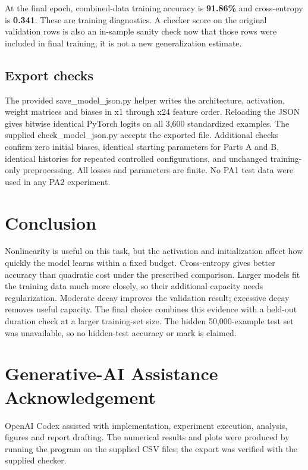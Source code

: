 \documentclass[11pt,a4paper]{article}
\begin{document}
At the final epoch, combined-data training accuracy is \textbf{91.86\%} and cross-entropy is \textbf{0.341}. These are training diagnostics. A checker score on the original validation rows is also an in-sample sanity check now that those rows were included in final training; it is not a new generalization estimate.


\subsection*{Export checks}

The provided save\_model\_json.py helper writes the architecture, activation, weight matrices and biases in x1 through x24 feature order. Reloading the JSON gives bitwise identical PyTorch logits on all 3,600 standardized examples. The supplied check\_model\_json.py accepts the exported file. Additional checks confirm zero initial biases, identical starting parameters for Parts A and B, identical histories for repeated controlled configurations, and unchanged training-only preprocessing. All losses and parameters are finite. No PA1 test data were used in any PA2 experiment.


\section{Conclusion}

Nonlinearity is useful on this task, but the activation and initialization affect how quickly the model learns within a fixed budget. Cross-entropy gives better accuracy than quadratic cost under the prescribed comparison. Larger models fit the training data much more closely, so their additional capacity needs regularization. Moderate decay improves the validation result; excessive decay removes useful capacity. The final choice combines this evidence with a held-out duration check at a larger training-set size. The hidden 50,000-example test set was unavailable, so no hidden-test accuracy or mark is claimed.


\section{Generative-AI Assistance Acknowledgement}

OpenAI Codex assisted with implementation, experiment execution, analysis, figures and report drafting. The numerical results and plots were produced by running the program on the supplied CSV files; the export was verified with the supplied checker.
\end{document}
